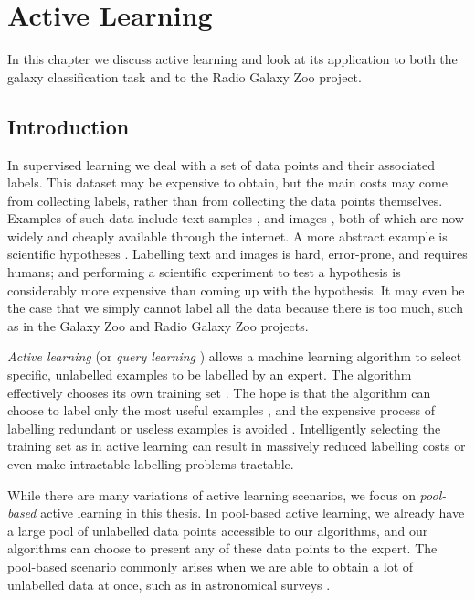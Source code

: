 
\chapter{Active Learning}
\label{cha:active-learning}

In this chapter we discuss active learning and look at its application to both
the galaxy classification task and to the Radio Galaxy Zoo project.

\section{Introduction}
\label{sec:intro-active-learning}
    
    In supervised learning we deal with a set of data points and their
    associated labels. This dataset may be expensive to obtain, but the main
    costs may come from collecting labels, rather than from collecting the data
    points themselves. Examples of such data include text samples
    \citep{lewis94, mccallum98}, and images \citep{loy11, lintott08}, both of
    which are now widely and cheaply available through the internet. A more
    abstract example is scientific hypotheses \citep{king04}. Labelling text and
    images is hard, error-prone, and requires humans; and performing a
    scientific experiment to test a hypothesis is considerably more expensive
    than coming up with the hypothesis. It may even be the case that we simply
    cannot label all the data because there is too much, such as in the Galaxy
    Zoo \citep{lintott08} and Radio Galaxy Zoo \citep{banfield15} projects.

    \emph{Active learning} (or \emph{query learning} \citep{settles09, seung92,angluin86})
    allows a machine learning algorithm to select specific, unlabelled examples
    to be labelled by an expert. The algorithm effectively chooses its own
    training set \citep{settles09}. The hope is that the algorithm can choose to
    label only the most useful examples \citep{mccallum98}, and the expensive
    process of labelling redundant or useless examples is avoided
    \citep{engelson99}. Intelligently selecting the training set as in active
    learning can result in massively reduced labelling costs \citep{lewis94,
    king04} or even make intractable labelling problems tractable.

    While there are many variations of active learning scenarios, we focus on
    \emph{pool-based} active learning in this thesis. In pool-based active
    learning, we already have a large pool of unlabelled data points accessible
    to our algorithms, and our algorithms can choose to present any of these
    data points to the expert. The pool-based scenario commonly arises when we
    are able to obtain a lot of unlabelled data at once, such as in astronomical
    surveys \citep{pelleg04, richards12, marshall15}.

